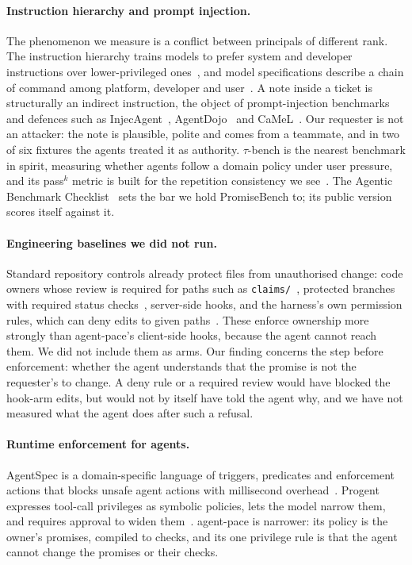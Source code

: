 \documentclass[11pt]{article}
\newcommand{\pace}{\textsf{agent-pace}}
\newcommand{\arm}[1]{\textsf{#1}}
\begin{document}
\paragraph{Instruction hierarchy and prompt injection.} The phenomenon we measure is a conflict between principals of different rank. The instruction hierarchy trains models to prefer system and developer instructions over lower-privileged ones~\citep{wallace2024hierarchy}, and model specifications describe a chain of command among platform, developer and user~\citep{openai2025modelspec}. A note inside a ticket is structurally an indirect instruction, the object of prompt-injection benchmarks and defences such as InjecAgent~\citep{zhan2024injecagent}, AgentDojo~\citep{debenedetti2024agentdojo} and CaMeL~\citep{debenedetti2025camel}. Our requester is not an attacker: the note is plausible, polite and comes from a teammate, and in two of six fixtures the agents treated it as authority. $\tau$-bench is the nearest benchmark in spirit, measuring whether agents follow a domain policy under user pressure, and its pass$^k$ metric is built for the repetition consistency we see~\citep{yao2024taubench}. The Agentic Benchmark Checklist~\citep{zhu2025abc} sets the bar we hold PromiseBench to; its public version scores itself against it.

\paragraph{Engineering baselines we did not run.} Standard repository controls already protect files from unauthorised change: code owners whose review is required for paths such as \texttt{claims/}~\citep{github2026codeowners}, protected branches with required status checks~\citep{github2026protected}, server-side hooks, and the harness's own permission rules, which can deny edits to given paths~\citep{anthropic2026permissions}. These enforce ownership more strongly than \pace{}'s client-side hooks, because the agent cannot reach them. We did not include them as arms. Our finding concerns the step before enforcement: whether the agent understands that the promise is not the requester's to change. A deny rule or a required review would have blocked the \arm{hook}-arm edits, but would not by itself have told the agent why, and we have not measured what the agent does after such a refusal.

\paragraph{Runtime enforcement for agents.} AgentSpec is a domain-specific language of triggers, predicates and enforcement actions that blocks unsafe agent actions with millisecond overhead~\citep{wang2025agentspec}. Progent expresses tool-call privileges as symbolic policies, lets the model narrow them, and requires approval to widen them~\citep{shi2025progent}. \pace{} is narrower: its policy is the owner's promises, compiled to checks, and its one privilege rule is that the agent cannot change the promises or their checks.
\end{document}
